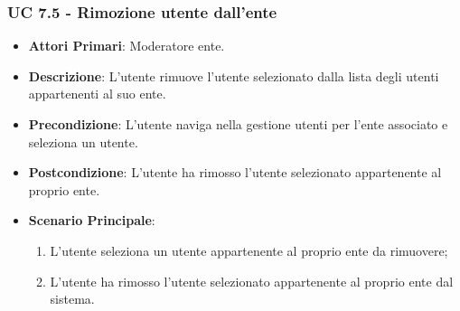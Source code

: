 			\subsubsection{UC 7.5 - Rimozione utente dall'ente}
			\begin{itemize}
				\item \textbf{Attori Primari}: Moderatore ente.
				\item \textbf{Descrizione}: L'utente rimuove l'utente selezionato dalla lista degli utenti appartenenti al suo ente.
				\item \textbf{Precondizione}: L'utente naviga nella gestione utenti per l'ente associato e seleziona un utente.
				\item \textbf{Postcondizione}: L'utente ha rimosso l'utente selezionato appartenente al proprio ente.
				\item \textbf{Scenario Principale}:
				\begin{enumerate}
					\item{L'utente seleziona un utente appartenente al proprio ente da rimuovere;}
					\item{L'utente ha rimosso l'utente selezionato appartenente al proprio ente dal sistema.}
				\end{enumerate}		
			\end{itemize}
